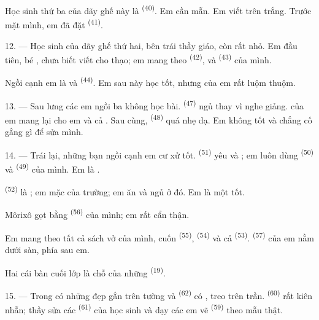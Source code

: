 Học sinh thứ ba của dãy ghế này là  \textsuperscript{(40)}. Em cần mẫn.
Em viết trên  trắng. Trước mặt mình, em đã đặt 
\textsuperscript{(41)}.

12. --- Học sinh của dãy ghế thứ hai, bên trái thầy giáo, còn rất nhỏ. Em đầu tiên, bé
, chưa biết viết cho thạo; em mang theo 
\textsuperscript{(42)},  và  \textsuperscript{(43)} của
mình.

Ngồi cạnh em là  và  \textsuperscript{(44)}. Em sau này
học tốt, nhưng  của em rất luộm thuộm.

13. --- Sau lưng các em ngồi ba  không học bài.
 \textsuperscript{(47)} ngủ thay vì nghe giảng. 
của em mang lại cho em  và cả . Sau cùng,
 \textsuperscript{(48)} quá nhẹ dạ. Em  không tốt và
chẳng cố gắng gì để sửa mình.

14. --- Trái lại, những bạn ngồi cạnh em cư xử tốt. 
\textsuperscript{(51)} yêu  và ; em luôn dùng
 \textsuperscript{(50)} và  \textsuperscript{(49)} của
mình. Em là .

 \textsuperscript{(52)} là ; em mặc
 của trường; em ăn và ngủ ở đó. Em là một  tốt.

Môrixô gọt  bằng  \textsuperscript{(56)} của mình; em
rất cẩn thận.

Em mang theo tất cả sách vở của mình, cuốn  \textsuperscript{(55)},
 \textsuperscript{(54)} và cả 
\textsuperscript{(53)}.  \textsuperscript{(57)} của em nằm dưới sàn,
phía sau em.

Hai cái bàn cuối lớp là chỗ của những  \textsuperscript{(19)}.

\VUsaut{4.6mm}
\VUsaut{3.4mm}

15. --- Trong  có những  đẹp gắn trên tường và
 \textsuperscript{(62)} có , treo trên trần.
 \textsuperscript{(60)} rất kiên nhẫn; thầy sửa các 
\textsuperscript{(61)} của học sinh và dạy các em vẽ 
\textsuperscript{(59)} theo mẫu thật.

